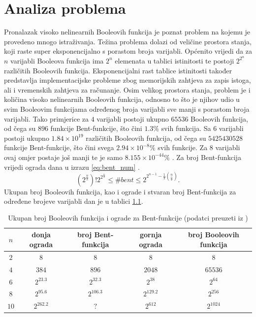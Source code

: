 \chapter{Analiza problema}
Pronalazak visoko nelinearnih Booleovih funkcija je poznat problem na kojemu je provedeno mnogo istraživanja.
Težina problema dolazi od veličine prostora stanja, koji raste super eksponencijalno s porastom broja varijabli.
Općenito vrijedi da za $n$ varijabli Booleova funkcija ima $2^n$ elemenata u tablici istinitosti te postoji $2^{2^n}$ različitih Booleovih funkcija.
Eksponencijalni rast tablice istinitosti također predstavlja implementacijske probleme zbog memorijskih zahtjeva za zapis istoga, ali i vremenskih zahtjeva za računanje.
Osim velikog prostora stanja, problem je i količina visoko nelinearnih Booleovih funkcija, odnosno to što je njihov udio u svim Booleovim funkcijama određenog broja varijabli sve manji s porastom broja varijabli.
Tako primjerice za $4$ varijabli postoji ukupno $65536$ Booleovih funkcija, od čega su $896$ funkcije Bent-funkcije, što čini $1.3\%$ svih funkcija.
Sa $6$ varijabli postoji ukupno $1.84 \times 10^{19}$ različitih Booleovih funkcija, od čega su $5425430528$ funkcije Bent-funkcije, što čini svega $2.94 \times 10^{-8}\%$ svih funkcije.
Za $8$ varijabli ovaj omjer postaje još manji te je samo $8.155 \times 10^{-44}\%$ \cite{DiscoveryOfBent}.
Za broj Bent-funkcija vrijedi ograda dana u izrazu \eqref{eq:bent_num} \cite{CryptographicBooleanFunctions}.
\begin{equation}\label{eq:bent_num}
    \left(2^{\frac{n}{2}}\right)! 2^{2^{\frac{n}{2}}} \leq
    \#bent \leq
    2^{2^{n-1}-\frac{1}{2}\binom{n}{\frac{n}{2}}}.
\end{equation}
Ukupan broj Booleovih funkcija, kao i ograde i stvaran broj Bent-funkcija za određene brojeve varijabli dan je u tablici \ref{tbl:boolean_count}.
\begin{table}[]
\begin{tabular}{c|cccc}
$n$ & donja ograda & broj Bent-funkcija & gornja ograda & broj Booleovih funkcija \\ \hline
$2$ & $8$ & $8$ & $8$ & $8$ \\
$4$ & $384$ & $896$ & $2048$ & $65536$ \\
$6$ & $2^{23.3}$ & $2^{32.3}$ & $2^{38}$ & $2^{64}$ \\
$8$ & $2^{95.6}$ & $2^{106.3}$ & $2^{129.2}$ & $2^{256}$ \\
$10$ & $2^{262.2}$ & $?$ & $2^{612}$ & $2^{1024}$
\end{tabular}
\caption{Ukupan broj Booleovih funkcija i ograde za Bent-funkcije (podatci preuzeti iz \cite{CryptographicBooleanFunctions})}
\label{tbl:boolean_count}
\end{table}

